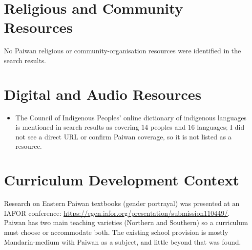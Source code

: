 \documentclass[12pt]{article}
\begin{document}
\section{Religious and Community Resources}
No Paiwan religious or community-organisation resources were identified in the search results.

\section{Digital and Audio Resources}
\begin{itemize}
\item The Council of Indigenous Peoples' online dictionary of indigenous languages is mentioned in search results as covering 14 peoples and 16 languages; I did not see a direct URL or confirm Paiwan coverage, so it is not listed as a resource.
\end{itemize}

\section{Curriculum Development Context}
Research on Eastern Paiwan textbooks (gender portrayal) was presented at an IAFOR conference: \url{https://egen.iafor.org/presentation/submission110449/}. Paiwan has two main teaching varieties (Northern and Southern) so a curriculum must choose or accommodate both. The existing school provision is mostly Mandarin-medium with Paiwan as a subject, and little beyond that was found.
\end{document}
